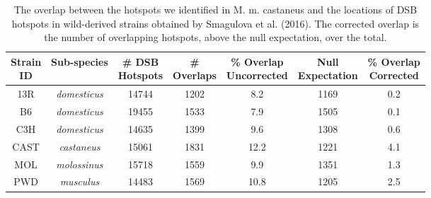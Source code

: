 

\begin{table}
\caption{The overlap between the hotspots we identified in M. m. castaneus and the locations of DSB hotspots in wild-derived strains obtained by Smagulova et al. (2016). The corrected overlap is the number of overlapping hotspots, above the null expectation, over the total.}
\begin{tabular} {c c c c c c c} \\ [ 0.5ex ] \hline

\makecell{Strain\\ID} & Sub-species & \makecell{\# DSB \\ Hotspots} & \makecell{\# \\ Overlaps} & \makecell{\% Overlap \\ Uncorrected} & \makecell{Null \\Expectation} & \makecell{\% Overlap \\ Corrected}\\ \hline
13R & \emph{domesticus} & 14744 & 1202 & 8.2 & 1169 & 0.2 \\
B6 & \emph{domesticus}& 19455 & 1533 & 7.9 & 1505 & 0.1 \\ 
C3H & \emph{domesticus} & 14635 & 1399 & 9.6 & 1308 & 0.6 \\
CAST & \emph{castaneus} & 15061 & 1831 & 12.2 & 1221 & 4.1 \\
MOL & \emph{molossinus} & 15718 & 1559 & 9.9 & 1351 & 1.3 \\
PWD & \emph{musculus} & 14483 & 1569 & 10.8 & 1205 & 2.5 \\ \hline


\end{tabular}
 \label{tab:C2ST4}

\end{table}
